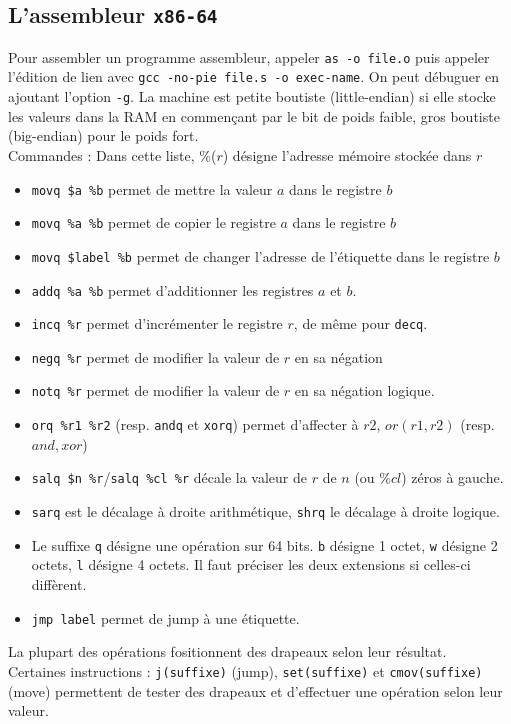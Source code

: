 \documentclass{cours}
\begin{document}
\subsection{L'assembleur \texttt{x86-64}}
Pour assembler un programme assembleur, appeler \texttt{as -o file.o} puis appeler l'édition de lien avec \texttt{gcc -no-pie file.s -o exec-name}.
On peut débuguer en ajoutant l'option \texttt{-g}.
La machine est petite boutiste (little-endian) si elle stocke les valeurs dans la RAM en commençant par le bit de poids faible, gros boutiste (big-endian) pour le poids fort. \\
Commandes : Dans cette liste, \%($r$) désigne l'adresse mémoire stockée dans $r$
\begin{itemize}
    \item \texttt{movq \$a \%b} permet de mettre la valeur $a$ dans le registre $b$
    \item \texttt{movq \%a \%b} permet de copier le registre $a$ dans le registre $b$
    \item \texttt{movq \$label \%b} permet de changer l'adresse de l'étiquette dans le registre $b$
    \item \texttt{addq \%a \%b} permet d'additionner les registres $a$ et $b$.
    \item \texttt{incq \%r} permet d'incrémenter le registre $r$, de même pour \texttt{decq}.
    \item \texttt{negq \%r} permet de modifier la valeur de $r$ en sa négation
    \item \texttt{notq \%r} permet de modifier la valeur de $r$ en sa négation logique.
    \item \texttt{orq \%r1 \%r2} (resp. \texttt{andq} et \texttt{xorq}) permet d'affecter à $r2$, $or(r1, r2)$ (resp. $and, xor$)
    \item \texttt{salq \$n \%r}/\texttt{salq \%cl \%r} décale la valeur de $r$ de $n$ (ou $\%cl$) zéros à gauche.
    \item \texttt{sarq} est le décalage à droite arithmétique, \texttt{shrq} le décalage à droite logique.
    \item Le suffixe \texttt{q} désigne une opération sur 64 bits. \texttt{b} désigne 1 octet, \texttt{w} désigne 2 octets, \texttt{l} désigne 4 octets. Il faut préciser les deux extensions si celles-ci diffèrent.
    \item \texttt{jmp label} permet de jump à une étiquette.
\end{itemize}

La plupart des opérations fositionnent des drapeaux selon leur résultat.\\
Certaines instructions : \texttt{j(suffixe)} (jump), \texttt{set(suffixe)} et \texttt{cmov(suffixe)}(move) permettent de tester des drapeaux et d'effectuer une opération selon leur valeur.
\end{document}

